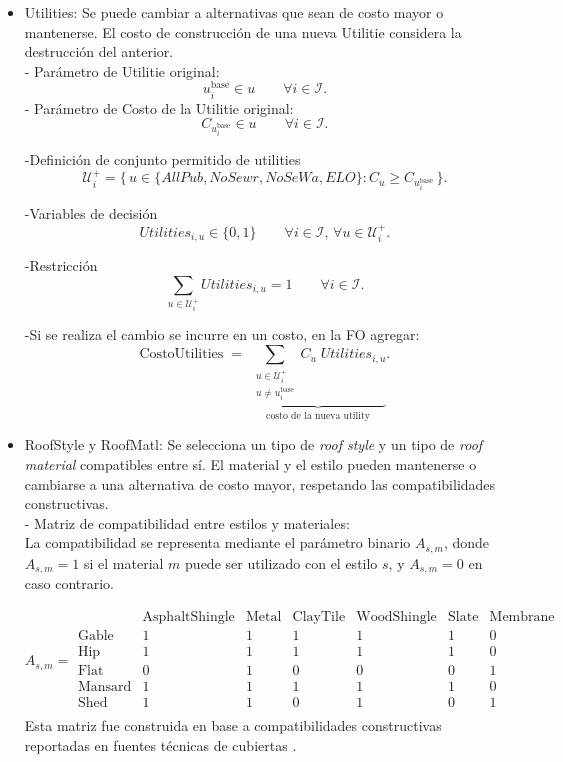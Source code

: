 \begin{itemize}
    \item Utilities: Se puede cambiar a alternativas que sean de costo mayor o mantenerse. El costo de construcción de una nueva Utilitie considera la destrucción del anterior. \\
    - Parámetro de Utilitie original: 
\[
u_i^{\text{base}} \in u \qquad \forall i \in \mathcal{I}.
\]
 - Parámetro de Costo de la Utilitie original:
 \[
C_{u_i^{\text{base}}} \in u \qquad \forall i \in \mathcal{I}.
\]
 
-Definición de conjunto permitido de utilities 
\[
\mathcal{U}^+_i = \{\, u \in \{AllPub, NoSewr, NoSeWa, ELO\} : C_u \ge C_{u_i^{\text{base}}} \,\}.
\]

-Variables de decisión
\[
Utilities_{i,u} \in \{0,1\} \qquad \forall i \in \mathcal{I},\, \forall u \in \mathcal{U}^+_i.
\]

-Restricción
\[
\sum_{u \in \mathcal{U}^+_i} Utilities_{i,u} = 1 \qquad \forall i \in \mathcal{I}.
\]

-Si se realiza el cambio se incurre en un costo, en la FO agregar: 
\[
\text{CostoUtilities} \;=\;
\underbrace{\sum_{\substack{u \in \mathcal{U}^+_i \\ u \neq u_i^{\text{base}}}} \! C_u \; Utilities_{i,u}}_{\text{costo de la nueva utility}}
.
\]

    \item RoofStyle y RoofMatl:
Se selecciona un tipo de \textit{roof style} y un tipo de \textit{roof material} compatibles entre sí. El material y el estilo pueden mantenerse o cambiarse a una alternativa de costo mayor, respetando las compatibilidades constructivas.\\

    - Matriz de compatibilidad entre estilos y materiales:\\
    La compatibilidad se representa mediante el parámetro binario $A_{s,m}$, donde $A_{s,m} = 1$ si el material $m$ puede ser utilizado con el estilo $s$, y $A_{s,m} = 0$ en caso contrario.
    
    \[
    A_{s,m} =
    \begin{array}{c|cccccc}
     & \text{AsphaltShingle} & \text{Metal} & \text{ClayTile} & \text{WoodShingle} & \text{Slate} & \text{Membrane} \\
    \hline
    \text{Gable}   & 1 & 1 & 1 & 1 & 1 & 0 \\
    \text{Hip}     & 1 & 1 & 1 & 1 & 1 & 0 \\
    \text{Flat}    & 0 & 1 & 0 & 0 & 0 & 1 \\
    \text{Mansard} & 1 & 1 & 1 & 1 & 1 & 0 \\
    \text{Shed}    & 1 & 1 & 0 & 1 & 0 & 1 \\
    \end{array}
    \]
    Esta matriz fue construida en base a compatibilidades constructivas reportadas en fuentes técnicas de cubiertas 
    \cite{roofcrafters2024, renoworks2023, wikipediaFlatRoof2024}.\\


\end{itemize}
